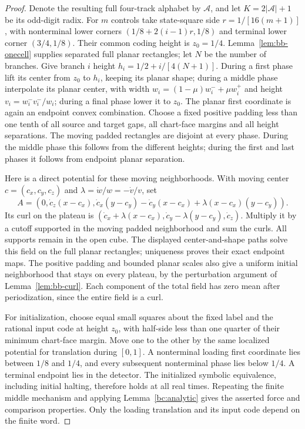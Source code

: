 \begin{proof}
Denote the resulting full four-track alphabet by $\mathcal A$, and let
$K=2|\mathcal A|+1$ be its odd-digit radix.
For $m$ controls take state-square side $r=1/[16(m+1)]$, with nonterminal
lower corners $(1/8+2(i-1)r,1/8)$ and terminal lower corner $(3/4,1/8)$.
Their common coding height is $z_0=1/4$. Lemma~\ref{lem:bb-onecell} supplies
separated full planar rectangles; let $N$ be the number of branches.
Give branch $i$ height
$h_i=1/2+i/[4(N+1)]$. During a first phase lift its center from $z_0$
to $h_i$, keeping its planar shape; during a middle phase interpolate
its planar center, with width
$w_i=(1-\mu)w_i^-+\mu w_i^+$ and height
$v_i=w_i^-v_i^-/w_i$; during a final phase lower it to $z_0$.
The planar first coordinate is again an endpoint convex combination.
Choose a fixed positive padding less than one tenth of all source and
target gaps, all chart-face margins and all height separations. The
moving padded rectangles are disjoint at every phase. During the middle
phase this follows from the different heights; during the first and last
phases it follows from endpoint planar separation.

Here is a direct potential for these moving neighborhoods. With moving
center $c=(c_x,c_y,c_z)$ and $\lambda=\dot w/w=-\dot v/v$, set
\[
 A=(0,\dot c_z(x-c_x),
       \dot c_x(y-c_y)-\dot c_y(x-c_x)
                         +\lambda(x-c_x)(y-c_y)).
\]
Its curl on the plateau is
$(\dot c_x+\lambda(x-c_x),\dot c_y-\lambda(y-c_y),\dot c_z)$.
Multiply it by a cutoff supported in the moving padded neighborhood and
sum the curls. All supports remain in the open cube. The displayed
center-and-shape paths solve this field on the full planar rectangles;
uniqueness proves their exact endpoint maps. The positive padding and
bounded planar scales also give a uniform initial neighborhood that stays
on every plateau, by the perturbation argument of Lemma~\ref{lem:bb-curl}.
Each component of the total
field has zero mean after periodization, since the entire field is a curl.

For initialization, choose equal small squares about the fixed label and
the rational input code at height $z_0$, with half-side less than one
quarter of their minimum chart-face margin. Move one to the other by the
same localized potential for translation during $[0,1]$. A nonterminal
loading first coordinate lies between $1/8$ and $1/4$, and every subsequent
nonterminal phase lies below $1/4$. A terminal endpoint lies in the detector.
The initialized symbolic equivalence, including initial halting, therefore
holds at all real times. Repeating the finite middle mechanism and applying
Lemma~\ref{bc:analytic} gives the asserted force and comparison properties.
Only the loading translation and its input code depend on the finite word.
\end{proof}
